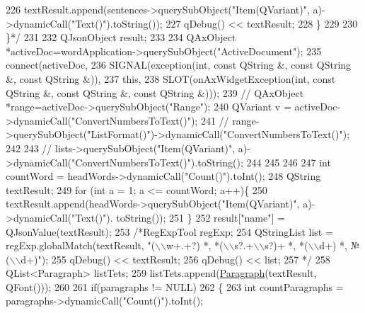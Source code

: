 \begin{DoxyCode}
226 \textcolor{comment}{                textResult.append(sentences->querySubObject("Item(QVariant)",
       a)->dynamicCall("Text()").toString());}
227 \textcolor{comment}{                qDebug() << textResult;}
228 \textcolor{comment}{            \}}
229 \textcolor{comment}{}
230 \textcolor{comment}{        \}*/}
231 
232         QJsonObject result;
233 
234         QAxObject *activeDoc=wordApplication->querySubObject(\textcolor{stringliteral}{"ActiveDocument"});
235         connect(activeDoc,
236                 SIGNAL(exception(\textcolor{keywordtype}{int}, \textcolor{keyword}{const} QString &, \textcolor{keyword}{const} QString &, \textcolor{keyword}{const} QString &)),
237                 \textcolor{keyword}{this},
238                 SLOT(onAxWidgetException(\textcolor{keywordtype}{int}, \textcolor{keyword}{const} QString &, \textcolor{keyword}{const} QString &, \textcolor{keyword}{const} QString &)));
239         \textcolor{comment}{// QAxObject *range=activeDoc->querySubObject("Range");}
240         QVariant v = activeDoc->dynamicCall(\textcolor{stringliteral}{"ConvertNumbersToText()"});
241         \textcolor{comment}{// range->querySubObject("ListFormat()")->dynamicCall("ConvertNumbersToText()");}
242 
243         \textcolor{comment}{// lists->querySubObject("Item(QVariant)", a)->dynamicCall("ConvertNumbersToText()").toString();}
244 
245 
246 
247         \textcolor{keywordtype}{int} countWord = headWords->dynamicCall(\textcolor{stringliteral}{"Count()"}).toInt();
248         QString textResult;
249         \textcolor{keywordflow}{for} (\textcolor{keywordtype}{int} a = 1; a <= countWord; a++)\{
250             textResult.append(headWords->querySubObject(\textcolor{stringliteral}{"Item(QVariant)"}, a)->dynamicCall(\textcolor{stringliteral}{"Text()"}).
      toString());
251         \}
252         result[\textcolor{stringliteral}{"name"}] = QJsonValue(textResult);
253         \textcolor{comment}{/*RegExpTool regExp;}
254 \textcolor{comment}{        QStringList list = regExp.globalMatch(textResult, "(\(\backslash\)\(\backslash\)w+.+?) *, *(\(\backslash\)\(\backslash\)s?.+\(\backslash\)\(\backslash\)s?)+ *, *(\(\backslash\)\(\backslash\)d+) *, №
       (\(\backslash\)\(\backslash\)d+)");}
255 \textcolor{comment}{        qDebug() << textResult;}
256 \textcolor{comment}{        qDebug() << list;}
257 \textcolor{comment}{*/}
258         QList<Paragraph> listTets;
259         listTets.append(\hyperlink{class_paragraph}{Paragraph}(textResult, QFont()));
260 
261         \textcolor{keywordflow}{if}(paragraphs != NULL)
262         \{
263             \textcolor{keywordtype}{int} countParagraphs = paragraphs->dynamicCall(\textcolor{stringliteral}{"Count()"}).toInt();

\end{DoxyCode}
